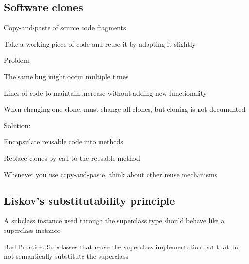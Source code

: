 \subsection{Software clones}
\enumstart
	\item Copy-and-paste of source code fragments
	\item Take a working piece of code and reuse it by adapting it slightly
	\item Problem:
	\enumstart
		\item The same bug might occur multiple times
		\item Lines of code to maintain increase without adding new functionality
		\item When changing one clone, must change all clones, but cloning is not documented
	\enumend
	\item Solution:
	\enumstart
		\item Encapsulate reusable code into methods
		\item Replace clones by call to the reusable method
		\item Whenever you use copy-and-paste, think about other reuse mechanisms
	\enumend
\enumend

\subsection{Liskov's substitutability principle}
\enumstart
	\item A subclass instance used through the superclass type should behave like a superclass instance
	\item Bad Practice: Subclasses that reuse the superclass implementation but that do not semantically substitute the superclass
\enumend

